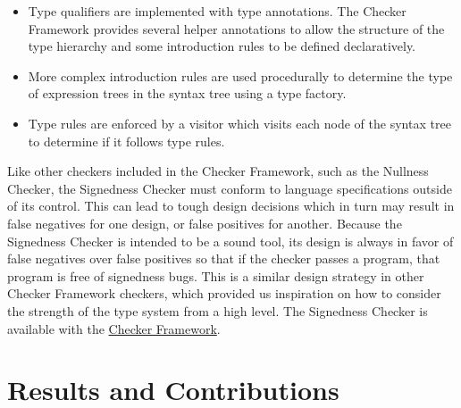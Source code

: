 \documentclass{sig-alternate-05-2015}
\begin{document}
\begin{itemize}\itemsep 0pt \parskip 0pt
  \item Type qualifiers are implemented with type annotations. The Checker Framework provides several helper annotations to allow the structure of the type hierarchy and some introduction rules to be defined declaratively.
  \item More complex introduction rules are used procedurally to determine the type of expression trees in the syntax tree using a type factory.
  \item Type rules are enforced by a visitor which visits each node of the syntax tree to determine if it follows type rules.
\end{itemize}

Like other checkers included in the Checker Framework, such as the Nullness Checker, the Signedness Checker must conform to language specifications outside of its control. This can lead to tough design decisions which in turn may result in false negatives for one design, or false positives for another. Because the Signedness Checker is intended to be a sound tool, its design is always in favor of false negatives over false positives so that if the checker passes a program, that program is free of signedness bugs. This is a similar design strategy in other Checker Framework checkers, which provided us inspiration on how to consider the strength of the type system from a high level. The Signedness Checker is available with the \href{https://github.com/typetools/checker-framework}{Checker Framework}.

\section{Results and Contributions}
\end{document}
